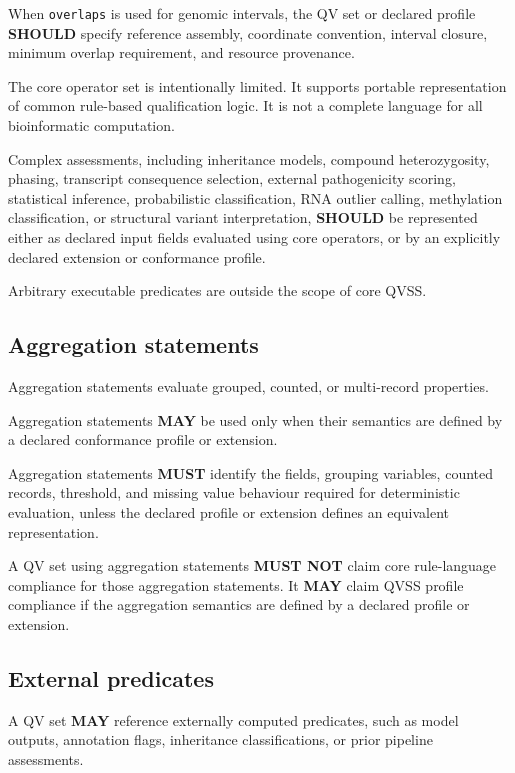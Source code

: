 \documentclass[11pt,a4paper]{article}
\begin{document}
When \texttt{overlaps} is used for genomic intervals, the QV set or declared profile \textbf{SHOULD} specify reference assembly, coordinate convention, interval closure, minimum overlap requirement, and resource provenance.

The core operator set is intentionally limited. It supports portable representation of common rule-based qualification logic. It is not a complete language for all bioinformatic computation.

Complex assessments, including inheritance models, compound heterozygosity, phasing, transcript consequence selection, external pathogenicity scoring, statistical inference, probabilistic classification, RNA outlier calling, methylation classification, or structural variant interpretation, \textbf{SHOULD} be represented either as declared input fields evaluated using core operators, or by an explicitly declared extension or conformance profile.

Arbitrary executable predicates are outside the scope of core QVSS.

\subsection{Aggregation statements}

Aggregation statements evaluate grouped, counted, or multi-record properties.

Aggregation statements \textbf{MAY} be used only when their semantics are defined by a declared conformance profile or extension.

Aggregation statements \textbf{MUST} identify the fields, grouping variables, counted records, threshold, and missing value behaviour required for deterministic evaluation, unless the declared profile or extension defines an equivalent representation.

A QV set using aggregation statements \textbf{MUST NOT} claim core rule-language compliance for those aggregation statements. It \textbf{MAY} claim QVSS profile compliance if the aggregation semantics are defined by a declared profile or extension.

\subsection{External predicates}

A QV set \textbf{MAY} reference externally computed predicates, such as model outputs, annotation flags, inheritance classifications, or prior pipeline assessments.
\end{document}
